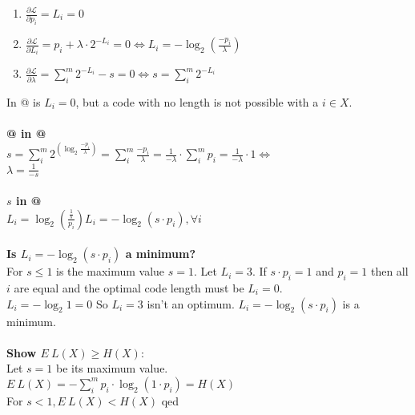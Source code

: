 \documentclass[a4paper,
  twoside, %
  headlines=2.1 %
  ]{scrartcl}
\makeatletter
\newcommand*{\rom}[1]{\expandafter\@slowromancap\romannumeral #1@}
\makeatother
\begin{document}
\begin{enumerate}[label=\Roman*, itemsep=-1em]
    \item $\frac{\partial \mathcal{L}}{\partial p_i} = L_i  = 0$\\
    \item $\frac{\partial \mathcal{L}}{\partial L_i} = p_i + \lambda \cdot 2^{-L_i}= 0 \iff L_i = - \log_2 (\frac{-p_i}{\lambda})$\\
    \item $\frac{\partial \mathcal{L}}{\partial \lambda} = \sum_i^m 2^{-L_i} - s = 0 \iff s = \sum_i^m 2^{-L_i}$
\end{enumerate}
In \rom{1} is $L_i = 0$, but a code with no length is not possible with a $i \in X$.\\
\\
\textbf{\rom{2} in \rom{3}}\\
$s = \sum_i^m 2^{(\log_2 \frac{-p_i}{\lambda})} = \sum_i^m \frac{-p_i}{\lambda} =  \frac{1}{-\lambda} \cdot \sum_i^m p_i = \frac{1}{-\lambda} \cdot 1 \iff$\\
$\lambda = \frac{1}{-s}$\\
\\
\textbf{$s$ in \rom{2}}\\
$L_i = \log_2 (\frac{\frac{1}{s}}{p_i}) L_i = - \log_2 (s \cdot p_i), \forall i$\\
\\
\textbf{Is $L_i = -\log_2 (s \cdot p_i)$ a minimum?}\\
For $s \leq 1$ is the maximum value $s = 1$. Let $L_i = 3$. If $s \cdot p_i = 1$ and $p_i = 1$ then all $i$ are equal and the optimal code length must be $L_i = 0$.\\
$L_i = -\log_2 1 = 0$ So $L_i = 3$ isn't an optimum.
$L_i = -\log_2 (s \cdot p_i)$ is a minimum.\\
\\
\textbf{Show $E\ L(X) \geq H(X)$}:\\
Let $s=1$ be its maximum value.\\
$E\ L(X) = - \sum_i^m p_i \cdot \log_2 (1 \cdot p_i) = H(X)$\\
For $s<1, E\ L(X) < H(X)$ qed
\end{document}
